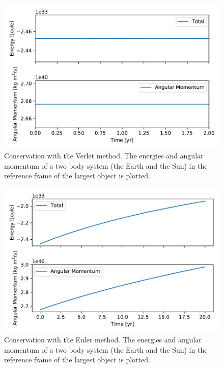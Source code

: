 \documentclass[10pt]{article}
\begin{document}
\begin{multicols}{2}
\begin{figure}[H]
    \centering
    \includegraphics[width=0.8\linewidth]{energy_conservation_verlet.pdf}
    \caption{Conservation with the Verlet method. The energies and
        angular momentum of a two body system (the Earth and the Sun) in
        the reference frame of the largest object is plotted.}
    \label{fig:energy_verlet}
\end{figure}


\begin{figure}[H]
    \centering
    \includegraphics[width=0.8\linewidth]{energy_conservation_euler.pdf}
    \caption{Conservation with the Euler method. The energies and angular
        momentum of a two body system (the
    Earth and the Sun) in the reference frame of the largest object is
plotted.}
    \label{fig:energy_euler}
\end{figure}


\end{multicols}
\end{document}
